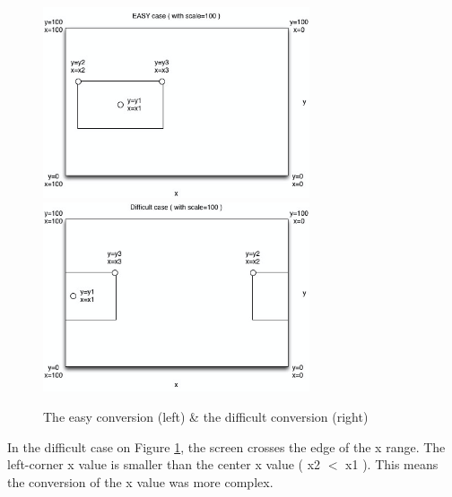 \documentclass{article}
\begin{document}
\begin{figure}[!ht]
  \centering
      \centerline{\includegraphics[width=0.7\textwidth]{Images/easy-conversion.png}
			\includegraphics[width=0.7\textwidth]{Images/diff-conversion.png}}
  \caption{The easy conversion (left) \& the difficult conversion (right)}
	\label{easyconv}
\end{figure}

In the difficult case on Figure \ref{easyconv}, the screen crosses the edge of the x range. The left-corner x value is smaller than the center x value ( x2 $<$ x1 ). This means the conversion of the x value was more complex.
\end{document}

